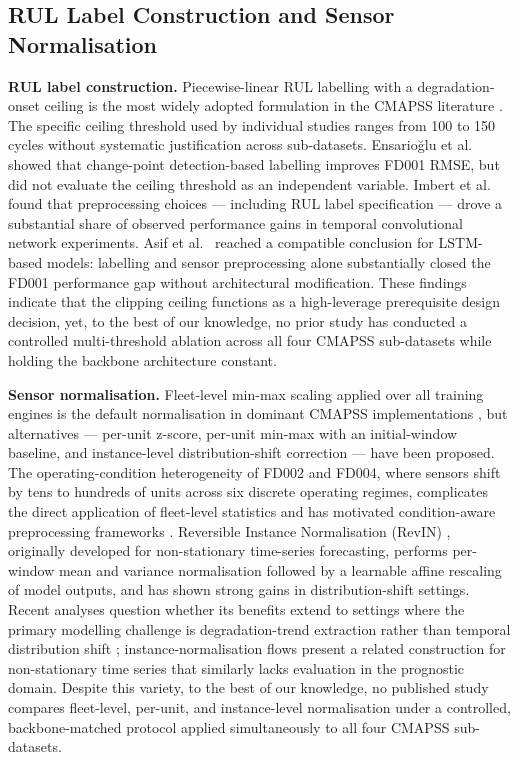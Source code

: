 \documentclass[review,12pt]{elsarticle}
\begin{document}
\subsection{RUL Label Construction and Sensor Normalisation}

\textbf{RUL label construction.} Piecewise-linear RUL labelling with a degradation-onset ceiling is the most widely adopted formulation in the CMAPSS literature \cite{ref05,ref06}. The specific ceiling threshold used by individual studies ranges from 100 to 150 cycles without systematic justification across sub-datasets. Ensario\u{g}lu et al.\ \cite{ref19} showed that change-point detection-based labelling improves FD001 RMSE, but did not evaluate the ceiling threshold as an independent variable. Imbert et al.\ \cite{ref18} found that preprocessing choices --- including RUL label specification --- drove a substantial share of observed performance gains in temporal convolutional network experiments. Asif et al.\ \cite{ref42} reached a compatible conclusion for LSTM-based models: labelling and sensor preprocessing alone substantially closed the FD001 performance gap without architectural modification. These findings indicate that the clipping ceiling functions as a high-leverage prerequisite design decision, yet, to the best of our knowledge, no prior study has conducted a controlled multi-threshold ablation across all four CMAPSS sub-datasets while holding the backbone architecture constant.

\textbf{Sensor normalisation.} Fleet-level min-max scaling applied over all training engines is the default normalisation in dominant CMAPSS implementations \cite{ref05,ref06,ref09}, but alternatives --- per-unit z-score, per-unit min-max with an initial-window baseline, and instance-level distribution-shift correction --- have been proposed. The operating-condition heterogeneity of FD002 and FD004, where sensors shift by tens to hundreds of units across six discrete operating regimes, complicates the direct application of fleet-level statistics and has motivated condition-aware preprocessing frameworks \cite{ref10,ref24}. Reversible Instance Normalisation (RevIN) \cite{ref23}, originally developed for non-stationary time-series forecasting, performs per-window mean and variance normalisation followed by a learnable affine rescaling of model outputs, and has shown strong gains in distribution-shift settings. Recent analyses question whether its benefits extend to settings where the primary modelling challenge is degradation-trend extraction rather than temporal distribution shift \cite{ref25,ref26}; instance-normalisation flows \cite{ref28} present a related construction for non-stationary time series that similarly lacks evaluation in the prognostic domain. Despite this variety, to the best of our knowledge, no published study compares fleet-level, per-unit, and instance-level normalisation under a controlled, backbone-matched protocol applied simultaneously to all four CMAPSS sub-datasets.
\end{document}
